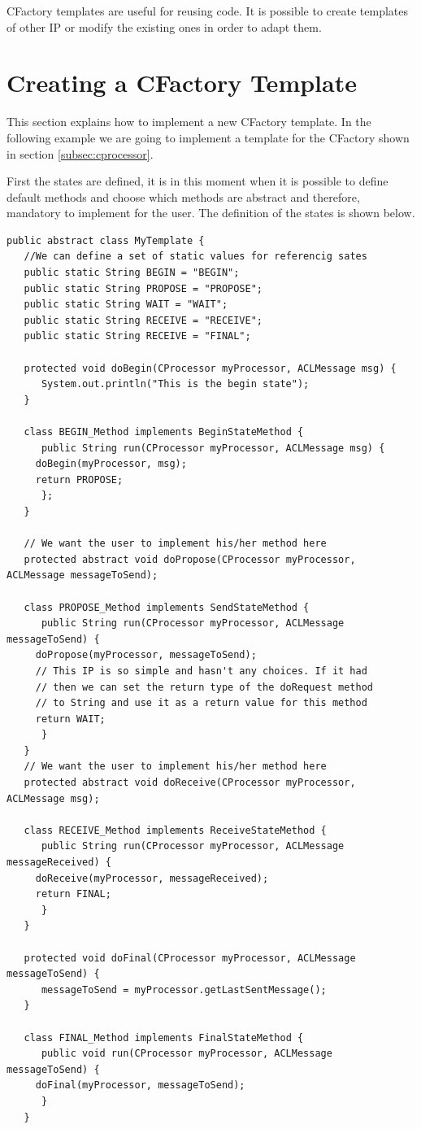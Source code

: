 CFactory templates are useful for reusing code. It is possible to create templates of other IP or modify the existing ones in order to adapt them.

\section{Creating a CFactory Template}
This section explains how to implement a new CFactory template. In the following example we are going to implement a template for the CFactory shown in section \ref{subsec:cprocessor}.

First the states are defined, it is in this moment when it is possible to define default methods and choose which methods are abstract and therefore, mandatory to implement for the user. The definition of the states is shown below.
\begin{lstlisting}[style=Java]
public abstract class MyTemplate {
   //We can define a set of static values for referencig sates
   public static String BEGIN = "BEGIN";
   public static String PROPOSE = "PROPOSE";
   public static String WAIT = "WAIT";
   public static String RECEIVE = "RECEIVE";
   public static String RECEIVE = "FINAL";

   protected void doBegin(CProcessor myProcessor, ACLMessage msg) {
      System.out.println("This is the begin state");
   }

   class BEGIN_Method implements BeginStateMethod {
      public String run(CProcessor myProcessor, ACLMessage msg) {
	 doBegin(myProcessor, msg);
	 return PROPOSE;
      };
   }

   // We want the user to implement his/her method here
   protected abstract void doPropose(CProcessor myProcessor, ACLMessage messageToSend);

   class PROPOSE_Method implements SendStateMethod {
      public String run(CProcessor myProcessor, ACLMessage messageToSend) {
	 doPropose(myProcessor, messageToSend);
	 // This IP is so simple and hasn't any choices. If it had
	 // then we can set the return type of the doRequest method
	 // to String and use it as a return value for this method
	 return WAIT;
      }
   }
   // We want the user to implement his/her method here
   protected abstract void doReceive(CProcessor myProcessor, ACLMessage msg);

   class RECEIVE_Method implements ReceiveStateMethod {
      public String run(CProcessor myProcessor, ACLMessage messageReceived) {
	 doReceive(myProcessor, messageReceived);
	 return FINAL;
      }
   }

   protected void doFinal(CProcessor myProcessor, ACLMessage messageToSend) {
      messageToSend = myProcessor.getLastSentMessage();
   }

   class FINAL_Method implements FinalStateMethod {
      public void run(CProcessor myProcessor, ACLMessage messageToSend) {
	 doFinal(myProcessor, messageToSend);
      }
   }
\end{lstlisting}

